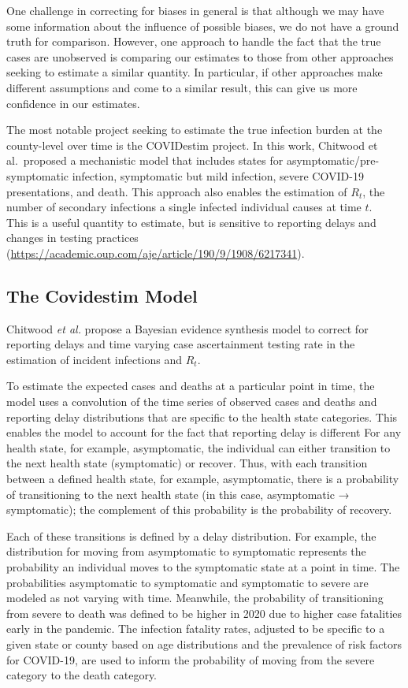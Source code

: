 \documentclass[12pt,twoside]{smiththesis}
\begin{document}
One challenge in correcting for biases in general is that although we may have some information about the influence of possible biases, we do not have a ground truth for comparison. However, one approach to handle the fact that the true cases are unobserved is comparing our estimates to those from other approaches seeking to estimate a similar quantity. In particular, if other approaches make different assumptions and come to a similar result, this can give us more confidence in our estimates.

The most notable project seeking to estimate the true infection burden at the county-level over time is the COVIDestim project. In this work, Chitwood et al.~proposed a mechanistic model that includes states for asymptomatic/pre-symptomatic infection, symptomatic but mild infection, severe COVID-19 presentations, and death. This approach also enables the estimation of \(R_t\), the number of secondary infections a single infected individual causes at time \(t\).\\
This is a useful quantity to estimate, but is sensitive to reporting delays and changes in testing practices (\url{https://academic.oup.com/aje/article/190/9/1908/6217341}).

\hypertarget{the-covidestim-model}{%
\subsection{The Covidestim Model}\label{the-covidestim-model}}

Chitwood \emph{et al.} propose a Bayesian evidence synthesis model to correct for reporting delays and time varying case ascertainment testing rate in the estimation of incident infections and \(R_t\).

To estimate the expected cases and deaths at a particular point in time, the model uses a convolution of the time series of observed cases and deaths and reporting delay distributions that are specific to the health state categories. This enables the model to account for the fact that reporting delay is different For any health state, for example, asymptomatic, the individual can either transition to the next health state (symptomatic) or recover. Thus, with each transition between a defined health state, for example, asymptomatic, there is a probability of transitioning to the next health state (in this case, asymptomatic → symptomatic); the complement of this probability is the probability of recovery.

Each of these transitions is defined by a delay distribution. For example, the distribution for moving from asymptomatic to symptomatic represents the probability an individual moves to the symptomatic state at a point in time. The probabilities asymptomatic to symptomatic and symptomatic to severe are modeled as not varying with time. Meanwhile, the probability of transitioning from severe to death was defined to be higher in 2020 due to higher case fatalities early in the pandemic. The infection fatality rates, adjusted to be specific to a given state or county based on age distributions and the prevalence of risk factors for COVID-19, are used to inform the probability of moving from the severe category to the death category.
\end{document}
